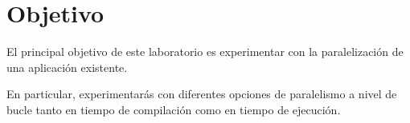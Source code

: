 \section{Objetivo}

El principal objetivo de este laboratorio es experimentar con la paralelización
de una aplicación existente.

En particular, experimentarás con diferentes opciones de paralelismo a nivel
de bucle tanto en tiempo de compilación como en tiempo de ejecución.

